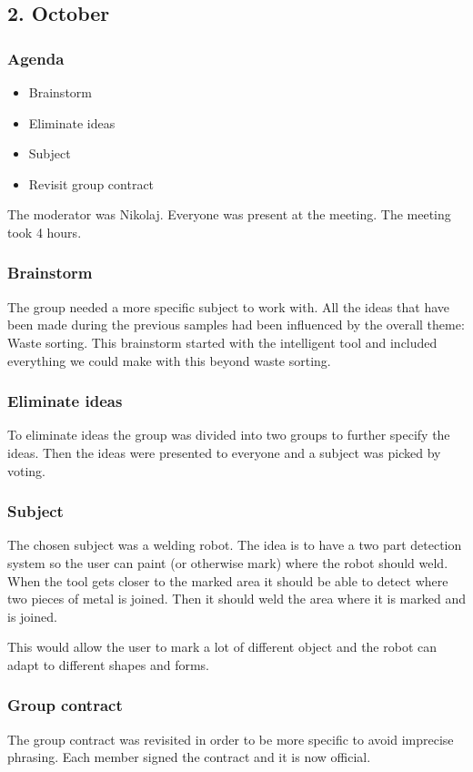 \subsection*{2. October}
\subsubsection{Agenda}
\begin{itemize}
\item Brainstorm
\item Eliminate ideas
\item Subject
\item Revisit group contract
\end{itemize}
The moderator was Nikolaj.
Everyone was present at the meeting.
The meeting took 4 hours.
\subsubsection{Brainstorm}
The group needed a more specific subject to work with.
All the ideas that have been made during the previous samples had been influenced by the overall theme: Waste sorting.
This brainstorm started with the intelligent tool and included everything we could make with this beyond waste sorting.
\subsubsection{Eliminate ideas}
To eliminate ideas the group was divided into two groups to further specify the ideas.
Then the ideas were presented to everyone and a subject was picked by voting.

\subsubsection{Subject}
The chosen subject was a welding robot.
The idea is to have a two part detection system so the user can paint (or otherwise mark) where the robot should weld.
When the tool gets closer to the marked area it should be able to detect where two pieces of metal is joined.
Then it should weld the area where it is marked and is joined.

This would allow the user to mark a lot of different object and the robot can adapt to different shapes and forms.

\subsubsection{Group contract}
The group contract was revisited in order to be more specific to avoid imprecise phrasing. 
Each member signed the contract and it is now official.